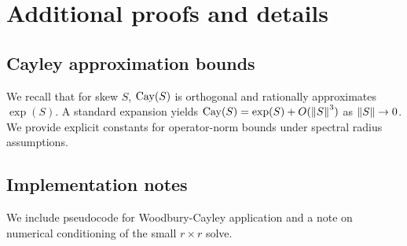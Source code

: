 \section{Additional proofs and details}

\subsection{Cayley approximation bounds}
\label{app:cayley}
We recall that for skew $S$, $\mathrm{Cay}(S)$ is orthogonal and rationally approximates $\exp(S)$.
A standard expansion yields $\mathrm{Cay}(S)=\exp(S)+O(\left\lVert S \right\rVert^3)$ as $\left\lVert S \right\rVert\to 0$.
We provide explicit constants for operator-norm bounds under spectral radius assumptions.

\subsection{Implementation notes}
We include pseudocode for Woodbury-Cayley application and a note on numerical conditioning of the small $r\times r$ solve.
